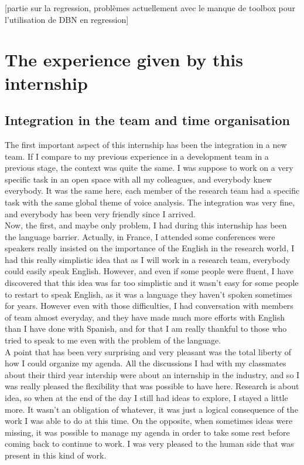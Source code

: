 \documentclass{report}
\begin{document}
		 [partie sur la regression, problèmes actuellement avec le manque de toolbox pour l'utilisation de DBN en regression]
		 		 		
	\chapter{The experience given by this internship}
	
		\section{Integration in the team and time organisation}
		
		The first important aspect of this internship has been the integration in a new team. If I compare to my previous experience in a development team in a previous stage, the context was quite the same. I was suppose to work on a very specific task in an open space with all my colleagues, and everybody knew everybody. It was the same here, each member of the research team had a specific task with the same global theme of voice analysis. The integration was very fine, and everybody has been very friendly since I arrived.\\
		
		Now, the first, and maybe only problem, I had during this internship has been the language barrier. Actually, in France, I attended some conferences were speakers really insisted on the importance of the English in the research world, I had this really simplistic idea that as I will work in a research team, everybody could easily speak English. However, and even if some people were fluent, I have discovered that this idea was far too simplistic and it wasn't easy for some people to restart to speak English, as it was a language they haven't spoken sometimes for years. However even with those difficulties, I had conversation with members of team almost everyday, and they have made much more efforts with English than I have done with Spanish, and for that I am really thankful to those who tried to speak to me even with the problem of the language.\\
		
		A point that has been very surprising and very pleasant was the total liberty of how I could organize my agenda. All the discussions I had with my classmates about their third year intership were about an internship in the industry, and so I was really pleased the flexibility that was possible to have here. Research is about idea, so when at the end of the day I still had ideas to explore, I stayed a little more. It wasn't an obligation of whatever, it was just a logical consequence of the work I was able to do at this time. On the opposite, when sometimes ideas were missing, it was possible to manage my agenda in order to take some rest before coming back to continue to work. I was very pleased to the human side that was present in this kind of work.
		
\end{document}
